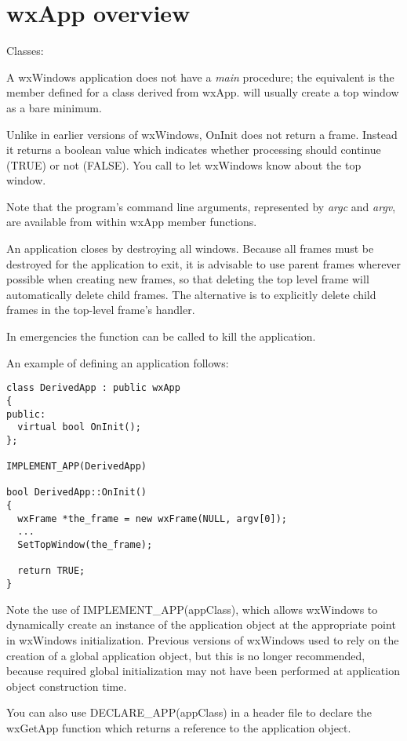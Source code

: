 \section{wxApp overview}\label{wxappoverview}

Classes: 

A wxWindows application does not have a {\it main} procedure; the equivalent is the
\rtfsp{} member defined for a class derived from wxApp.\rtfsp
{} will usually create a top window as a bare minimum.

Unlike in earlier versions of wxWindows, OnInit does not return a frame. Instead it
returns a boolean value which indicates whether processing should continue (TRUE) or not (FALSE).
You call  to let wxWindows know
about the top window.

Note that the program's command line arguments, represented by {\it
argc} and {\it argv}, are available from within wxApp member functions.

An application closes by destroying all windows. Because all frames must
be destroyed for the application to exit, it is advisable to use parent
frames wherever possible when creating new frames, so that deleting the
top level frame will automatically delete child frames. The alternative
is to explicitly delete child frames in the top-level frame's \rtfsp
handler.

In emergencies the  function can be called to kill the
application.

An example of defining an application follows:

\begin{verbatim}
class DerivedApp : public wxApp
{
public:
  virtual bool OnInit();
};

IMPLEMENT_APP(DerivedApp)

bool DerivedApp::OnInit()
{
  wxFrame *the_frame = new wxFrame(NULL, argv[0]);
  ...
  SetTopWindow(the_frame);

  return TRUE;
}
\end{verbatim}

Note the use of IMPLEMENT\_APP(appClass), which allows wxWindows to dynamically create an instance of the application object
at the appropriate point in wxWindows initialization. Previous versions of wxWindows used
to rely on the creation of a global application object, but this is no longer recommended,
because required global initialization may not have been performed at application object
construction time.

You can also use DECLARE\_APP(appClass) in a header file to declare the wxGetApp function which returns
a reference to the application object.

